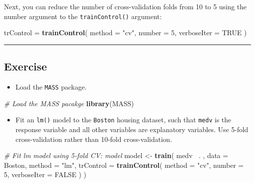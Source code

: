 \documentclass[
]{book}
\newenvironment{Shaded}{\begin{snugshade}}{\end{snugshade}}
\newcommand{\CommentTok}[1]{\textcolor[rgb]{0.56,0.35,0.01}{\textit{#1}}}
\newcommand{\DataTypeTok}[1]{\textcolor[rgb]{0.13,0.29,0.53}{#1}}
\newcommand{\DecValTok}[1]{\textcolor[rgb]{0.00,0.00,0.81}{#1}}
\newcommand{\KeywordTok}[1]{\textcolor[rgb]{0.13,0.29,0.53}{\textbf{#1}}}
\newcommand{\NormalTok}[1]{#1}
\newcommand{\OperatorTok}[1]{\textcolor[rgb]{0.81,0.36,0.00}{\textbf{#1}}}
\newcommand{\OtherTok}[1]{\textcolor[rgb]{0.56,0.35,0.01}{#1}}
\newcommand{\StringTok}[1]{\textcolor[rgb]{0.31,0.60,0.02}{#1}}
\providecommand{\tightlist}{%
  \setlength{\itemsep}{0pt}\setlength{\parskip}{0pt}}
\begin{document}
Next, you can reduce the number of cross-validation folds from 10 to 5 using the number argument to the \texttt{trainControl()} argument:

\begin{Shaded}
\begin{Highlighting}[]
\NormalTok{trControl =}\StringTok{ }\KeywordTok{trainControl}\NormalTok{(}
  \DataTypeTok{method =} \StringTok{"cv"}\NormalTok{, }\DataTypeTok{number =} \DecValTok{5}\NormalTok{,}
  \DataTypeTok{verboseIter =} \OtherTok{TRUE}
\NormalTok{)}
\end{Highlighting}
\end{Shaded}

\begin{center}\rule{0.5\linewidth}{0.5pt}\end{center}

\hypertarget{exercise-6}{%
\subsection*{Exercise}\label{exercise-6}}

\begin{itemize}
\tightlist
\item
  Load the \texttt{MASS} package.
\end{itemize}

\begin{Shaded}
\begin{Highlighting}[]
\CommentTok{# Load the MASS pacakge}
\KeywordTok{library}\NormalTok{(MASS)}
\end{Highlighting}
\end{Shaded}

\begin{itemize}
\tightlist
\item
  Fit an \texttt{lm()} model to the \texttt{Boston} housing dataset, such that \texttt{medv} is the response variable and all other variables are explanatory variables. Use 5-fold cross-validation rather than 10-fold cross-validation.
\end{itemize}

\begin{Shaded}
\begin{Highlighting}[]
\CommentTok{# Fit lm model using 5-fold CV: model}
\NormalTok{model <-}\StringTok{ }\KeywordTok{train}\NormalTok{(}
\NormalTok{  medv }\OperatorTok{~}\NormalTok{. , }\DataTypeTok{data =}\NormalTok{ Boston,}
  \DataTypeTok{method =} \StringTok{"lm"}\NormalTok{,}
  \DataTypeTok{trControl =} \KeywordTok{trainControl}\NormalTok{(}
    \DataTypeTok{method =} \StringTok{"cv"}\NormalTok{, }\DataTypeTok{number =} \DecValTok{5}\NormalTok{,}
    \DataTypeTok{verboseIter =} \OtherTok{FALSE}
\NormalTok{  )}
\NormalTok{)}
\end{Highlighting}
\end{Shaded}
\end{document}
